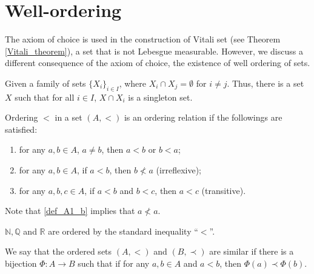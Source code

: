 \section{Well-ordering}

The axiom of choice is used in the construction of Vitali set (see Theorem \ref{Vitali_theorem}), a set that is not Lebesgue measurable. However, we discuss a different consequence of the axiom of choice, the existence of well ordering of sets.

\begin{theorem}\label{axiom_of_choice}
Given a family of sets $\{X_i\}_{i \in I}$, where $X_i \cap X_j = \emptyset$ for $i \neq j$. Thus, there is a set $X$ such that for all $i \in I$, $X \cap X_i$ is a singleton set.
\end{theorem}

\medskip

\begin{definition}
Ordering $<$ in a set $(A, <)$ is an ordering relation if the followings are satisfied:
\begin{enumerate}[label=(\alph*)]
    \item for any $a, b \in A$, $a \neq b$, then $a < b$ or $b < a$;
    
    \item for any $a, b \in A$, if $a < b$, then $b \nless a$ (irreflexive);\label{def_A1_b}
    
    \item for any $a, b, c \in A$, if $a < b$ and $b < c$, then $a < c$ (transitive).
\end{enumerate}
\end{definition}

\medskip

\begin{remark}
Note that \ref{def_A1_b} implies that $a \nless a$.
\end{remark}

\medskip

\begin{example}
$\mathbb{N}, \mathbb{Q}$ and $\mathbb{R}$ are ordered by the standard inequality ``$<$''.
\end{example}

\medskip

\begin{definition}
We say that the ordered sets $(A, <)$ and $(B, \prec)$ are similar if there is a bijection $\Phi: A \to B$ such that if for any $a, b \in A$ and $a < b$, then $\Phi(a) \prec \Phi(b)$.
\end{definition}

